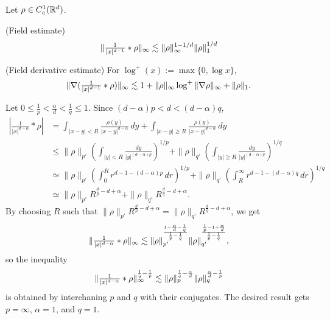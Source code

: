 \documentclass[11pt]{amsart}
\begin{document}
\begin{lem}
Let $\rho\in C_c^1(\mathbb{R}^d)$.
\begin{cond}
\item(Field estimate)
\[\|\tfrac1{|x|^{d-1}}*\rho\|_\infty\lesssim\|\rho\|_\infty^{1-1/d}\|\rho\|_1^{1/d}\]
\item(Field derivative estimate)
For $\log^+(x):=\max\{0,\log x\}$,
\[\|\nabla(\tfrac1{|x|^{d-1}}*\rho)\|_\infty\lesssim1+\|\rho\|_\infty\log^+\|\nabla\rho\|_\infty+\|\rho\|_1.\]
\end{cond}
\end{lem}

\begin{pfs}
\item
Let $0\le\frac1p<\frac\alpha d<\frac1q\le1$.
Since $(d-\alpha)p<d<(d-\alpha)q$,
\begin{align*}
|\tfrac1{|x|^{d-\alpha}}*\rho|
&=\int_{|x-y|<R}\frac{\rho(y)}{|x-y|^{d-\alpha}}\,dy+\int_{|x-y|\ge R}\frac{\rho(y)}{|x-y|^{d-\alpha}}\,dy\\
&\le\|\rho\|_{p'}(\int_{|y|<R}\frac{dy}{|y|^{(d-\alpha)p}})^{1/p}+\|\rho\|_{q'}(\int_{|y|\ge R}\frac{dy}{|y|^{(d-\alpha)q}})^{1/q}\\
&\simeq\|\rho\|_{p'}(\int_0^Rr^{d-1-(d-\alpha)p}\,dr)^{1/p}+\|\rho\|_{q'}(\int_R^\infty r^{d-1-(d-\alpha)q}\,dr)^{1/q}\\
&\simeq\|\rho\|_{p'}R^{\frac dp-d+\alpha}+\|\rho\|_{q'}R^{\frac dq-d+\alpha}.
\end{align*}
By choosing $R$ such that $\|\rho\|_{p'}R^{\frac dp-d+\alpha}=\|\rho\|_{q'}R^{\frac dq-d+\alpha}$, we get
\[\|\tfrac1{|x|^{d-\alpha}}*\rho\|_\infty\lesssim\|\rho\|_{p'}^{\frac{1-\frac\alpha d-\frac1q}{\frac1p-\frac1q}}\|\rho\|_{q'}^{\frac{\frac1p-1+\frac\alpha d}{\frac1p-\frac1q}},\]
so the inequality
\[\|\tfrac1{|x|^{d-\alpha}}*\rho\|_\infty^{\frac1q-\frac1p}\lesssim\|\rho\|_p^{\frac1q-\frac\alpha d}\|\rho\|_q^{\frac\alpha d-\frac1p}\]
is obtained by interchaning $p$ and $q$ with their conjugates.
The desired result gets $p=\infty$, $\alpha=1$, and $q=1$.


\end{pfs}
\end{document}
